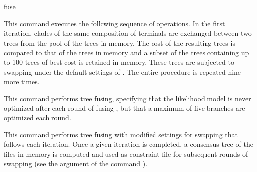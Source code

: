 \begin{command}{fuse}{}
\begin{poyexamples}
            {This command executes the following sequence of operations. In the
            first iteration, clades of the same composition of terminals are exchanged
            between two trees from the pool of the trees in memory. The cost of the
            resulting trees is compared to that of the trees in memory and a subset of
            the trees containing up to 100 trees of best cost is retained in memory.
            These trees are subjected to swapping under the default settings of
            . The entire procedure is repeated nine more times.}
            
            {This command performs tree fusing, specifying that the likelihood model is never optimized 
            after each round of fusing , but that a maximum of five branches are optimized
            each round.}
            
            {This command performs tree fusing  
            with modified settings for swapping that follows each iteration. Once
            a given iteration is completed, a consensus tree of the files in memory
            is computed and used as constraint file for subsequent rounds of swapping (see
            the argument  of the command
            ).}    

     \end{poyexamples}
        
        \begin{poyalso}
    \end{poyalso}

\end{command}

   
